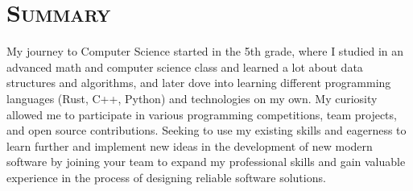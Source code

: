 \vspace*{-3em}
\section{\textsc{Summary}}

\qquad My journey to Computer Science started in the 5th grade, where I studied in an advanced math and computer science class and learned a lot about data structures and algorithms, and later dove into learning different programming languages (Rust, C++, Python) and technologies on my own. My curiosity allowed me to participate in various programming competitions, team projects, and open source contributions. Seeking to use my existing skills and eagerness to learn further and implement new ideas in the development of new modern software by joining your team to expand my professional skills and gain valuable experience in the process of designing reliable software solutions.

